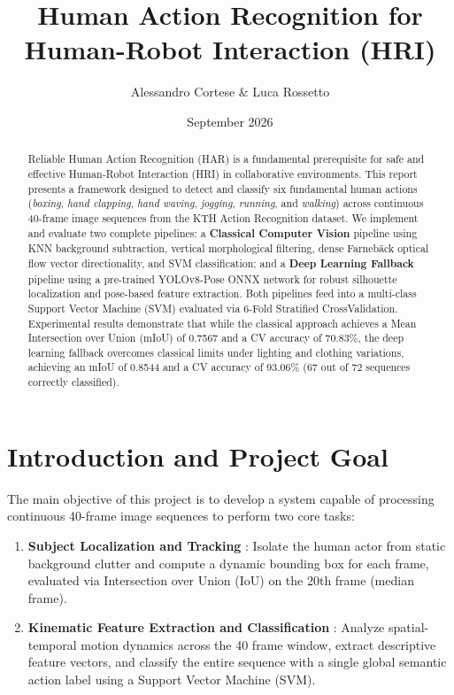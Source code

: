 \documentclass[11pt,a4paper]{article}
\title{\Large \textbf{Human Action Recognition for Human-Robot Interaction (HRI)}}
\author{Alessandro Cortese \& Luca Rossetto}
\date{September 2026}
\begin{document}
\maketitle

\begin{abstract}
Reliable Human Action Recognition (HAR) is a fundamental prerequisite for safe and effective Human-Robot Interaction (HRI) in collaborative environments. This report presents a framework designed to detect and classify six fundamental human actions (\textit{boxing}, \textit{hand clapping}, \textit{hand waving}, \textit{jogging}, \textit{running}, and \textit{walking}) across continuous 40-frame image sequences from the KTH Action Recognition dataset. We implement and evaluate two complete pipelines: a \textbf{Classical Computer Vision} pipeline using KNN background subtraction, vertical morphological filtering, dense Farneb\"ack optical flow vector directionality, and SVM classification; and a \textbf{Deep Learning Fallback} pipeline using a pre-trained YOLOv8-Pose ONNX network for robust silhouette localization and pose-based feature extraction. Both pipelines feed into a multi-class Support Vector Machine (SVM) evaluated via 6-Fold Stratified CrossValidation. Experimental results demonstrate that while the classical approach achieves a Mean Intersection over Union (mIoU) of 0.7567 and a CV accuracy of 70.83\%, the deep learning fallback overcomes classical limits under lighting and clothing variations, achieving an mIoU of 0.8544 and a CV accuracy of 93.06\% (67 out of 72 sequences correctly classified).
\end{abstract}

\section{Introduction and Project Goal}
The main objective of this project is to develop a system capable of processing continuous 40-frame image sequences to perform two core tasks:
\begin{enumerate}
    \item \textbf{Subject Localization and Tracking }: Isolate the human actor from static background clutter and compute a dynamic bounding box for each frame, evaluated via Intersection over Union (IoU) on the 20th frame (median frame).
    \item \textbf{Kinematic Feature Extraction and Classification }: Analyze spatial-temporal motion dynamics across the 40 frame window, extract descriptive feature vectors, and classify the entire sequence with a single global semantic action label using a Support Vector Machine (SVM).
\end{enumerate}
\end{document}
